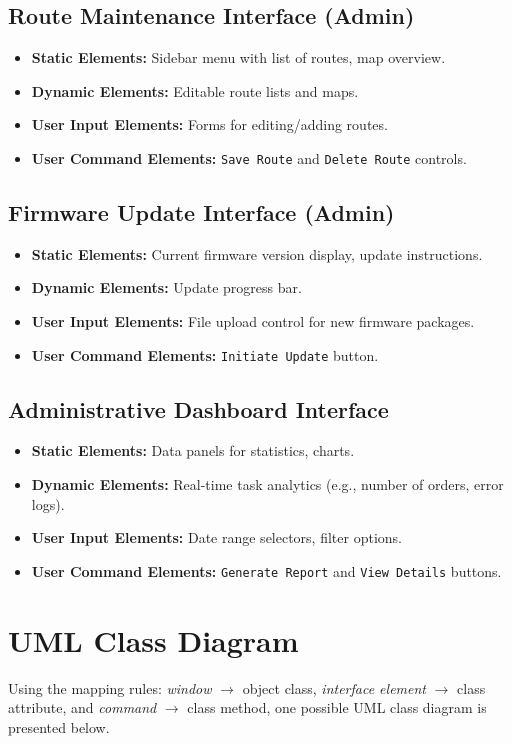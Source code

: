 \documentclass{article}
\begin{document}
\subsection{Route Maintenance Interface (Admin)}
\begin{itemize}
    \item \textbf{Static Elements:} Sidebar menu with list of routes, map overview.
    \item \textbf{Dynamic Elements:} Editable route lists and maps.
    \item \textbf{User Input Elements:} Forms for editing/adding routes.
    \item \textbf{User Command Elements:} \texttt{Save Route} and \texttt{Delete Route} controls.
\end{itemize}

\subsection{Firmware Update Interface (Admin)}
\begin{itemize}
    \item \textbf{Static Elements:} Current firmware version display, update instructions.
    \item \textbf{Dynamic Elements:} Update progress bar.
    \item \textbf{User Input Elements:} File upload control for new firmware packages.
    \item \textbf{User Command Elements:} \texttt{Initiate Update} button.
\end{itemize}

\subsection{Administrative Dashboard Interface}
\begin{itemize}
    \item \textbf{Static Elements:} Data panels for statistics, charts.
    \item \textbf{Dynamic Elements:} Real-time task analytics (e.g., number of orders, error logs).
    \item \textbf{User Input Elements:} Date range selectors, filter options.
    \item \textbf{User Command Elements:} \texttt{Generate Report} and \texttt{View Details} buttons.
\end{itemize}

\section{UML Class Diagram}
Using the mapping rules: \emph{window} $\rightarrow$ object class, \emph{interface element} $\rightarrow$ class attribute, and \emph{command} $\rightarrow$ class method, one possible UML class diagram is presented below.
\end{document}
